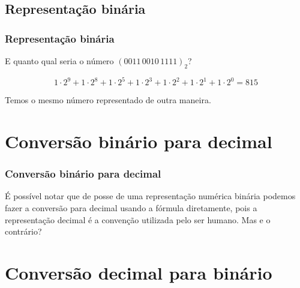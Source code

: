 \subsection{Representação binária}

\begin{frame}\frametitle{Representação binária}

E quanto qual seria o número $(0011\, 0010\, 1111)_2$?

\begin{equation}
1 \cdot 2^9 + 1 \cdot 2^8 + 1 \cdot 2^5 + 1 \cdot 2^3 + 1 \cdot 2^2 + 1 \cdot 2^1 + 1 \cdot 2^0 = 815
\end{equation}

Temos o mesmo número representado de outra maneira.

\end{frame}

\begin{frame}\frametitle{}


\end{frame}

\section{Conversão binário para decimal}

\begin{frame}\frametitle{Conversão binário para decimal}

É possível notar que de posse de uma representação numérica binária
podemos fazer a conversão para decimal usando a fórmula diretamente,
pois a representação decimal é a convenção utilizada pelo ser humano.
Mas e o contrário?

\end{frame}

\begin{frame}\frametitle{}


\end{frame}

\section{Conversão decimal para binário}

